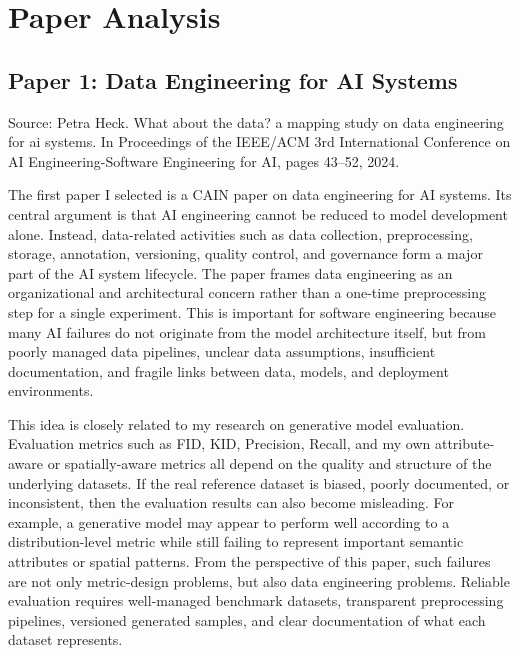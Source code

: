 \documentclass{article}
\begin{document}
\section{Paper Analysis}

\subsection{Paper 1: Data Engineering for AI Systems}

Source: \cite{heck2024data} Petra Heck. What about the data? a mapping study on data engineering for ai systems. In Proceedings of the
IEEE/ACM 3rd International Conference on AI Engineering-Software Engineering for AI, pages 43–52, 2024.

The first paper I selected is a CAIN paper on data engineering for AI systems. Its central argument is that AI engineering cannot be reduced to model development alone. Instead, data-related activities such as data collection, preprocessing, storage, annotation, versioning, quality control, and governance form a major part of the AI system lifecycle. The paper frames data engineering as an organizational and architectural concern rather than a one-time preprocessing step for a single experiment. This is important for software engineering because many AI failures do not originate from the model architecture itself, but from poorly managed data pipelines, unclear data assumptions, insufficient documentation, and fragile links between data, models, and deployment environments.

This idea is closely related to my research on generative model evaluation. Evaluation metrics such as FID, KID, Precision, Recall, and my own attribute-aware or spatially-aware metrics all depend on the quality and structure of the underlying datasets. If the real reference dataset is biased, poorly documented, or inconsistent, then the evaluation results can also become misleading. For example, a generative model may appear to perform well according to a distribution-level metric while still failing to represent important semantic attributes or spatial patterns. From the perspective of this paper, such failures are not only metric-design problems, but also data engineering problems. Reliable evaluation requires well-managed benchmark datasets, transparent preprocessing pipelines, versioned generated samples, and clear documentation of what each dataset represents.
\end{document}
